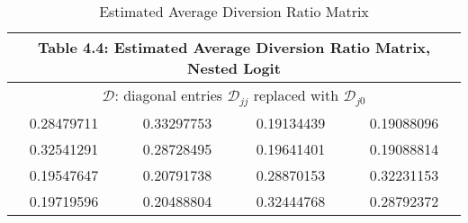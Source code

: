 
\begin{table}
\centering
\begin{tabular}{ |cccc| }
 \hline
\multicolumn{4}{|c|}{Table 4.4: Estimated Average Diversion Ratio Matrix, Nested Logit}
 \\
 \hline
\multicolumn{4}{|c|}{$\mathcal{D}$: diagonal entries $\mathcal{D}_{jj}$ replaced with $\mathcal{D}_{j0}$}
 \\
 \hline
 0.28479711 & 0.33297753 & 0.19134439 & 0.19088096   \\
0.32541291 & 0.28728495 & 0.19641401 & 0.19088814  \\
0.19547647 & 0.20791738 & 0.28870153 & 0.32231153  \\
0.19719596 & 0.20488804 & 0.32444768 & 0.28792372  \\
 \hline
\end{tabular}
\label{table4_4}
\caption{Estimated Average Diversion Ratio Matrix}
\end{table}

